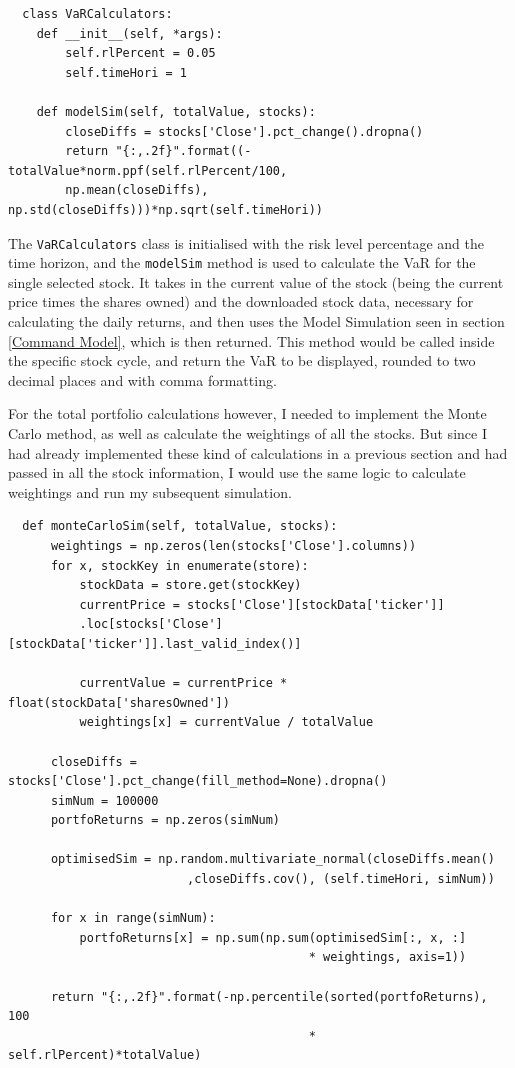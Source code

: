 \documentclass{article}
\begin{document}
\begin{verbatim}
  class VaRCalculators:
    def __init__(self, *args):
        self.rlPercent = 0.05
        self.timeHori = 1

    def modelSim(self, totalValue, stocks):
        closeDiffs = stocks['Close'].pct_change().dropna()
        return "{:,.2f}".format((-totalValue*norm.ppf(self.rlPercent/100,
        np.mean(closeDiffs), np.std(closeDiffs)))*np.sqrt(self.timeHori))
\end{verbatim}

\vspace{0.3cm}
The \texttt{VaRCalculators} class is initialised with the risk level percentage and the time horizon, and the \texttt{modelSim} method is used to calculate the VaR for the single selected stock. It takes in the current value of the stock (being the current price times the shares owned) and the downloaded stock data, necessary for calculating the daily returns, and then uses the  Model Simulation seen in section \ref{Command Model}, which is then returned. This method would be called inside the specific stock cycle, and return the VaR to be displayed, rounded to two decimal places and with comma formatting.\\\vspace{0.3cm}

For the total portfolio calculations however, I needed to implement the Monte Carlo method, as well as calculate the weightings of all the stocks. But since I had already implemented these kind of calculations in a previous section and had passed in all the stock information, I would use the same logic to calculate weightings and run my subsequent simulation.\\\vspace{0.3cm}

\begin{verbatim}
  def monteCarloSim(self, totalValue, stocks):
      weightings = np.zeros(len(stocks['Close'].columns))
      for x, stockKey in enumerate(store):
          stockData = store.get(stockKey)
          currentPrice = stocks['Close'][stockData['ticker']]
          .loc[stocks['Close'][stockData['ticker']].last_valid_index()]

          currentValue = currentPrice * float(stockData['sharesOwned'])
          weightings[x] = currentValue / totalValue
  
      closeDiffs = stocks['Close'].pct_change(fill_method=None).dropna()
      simNum = 100000
      portfoReturns = np.zeros(simNum)
  
      optimisedSim = np.random.multivariate_normal(closeDiffs.mean() 
                         ,closeDiffs.cov(), (self.timeHori, simNum)) 

      for x in range(simNum): 
          portfoReturns[x] = np.sum(np.sum(optimisedSim[:, x, :] 
                                          * weightings, axis=1))
          
      return "{:,.2f}".format(-np.percentile(sorted(portfoReturns), 100 
                                          * self.rlPercent)*totalValue)
\end{verbatim}
\end{document}
